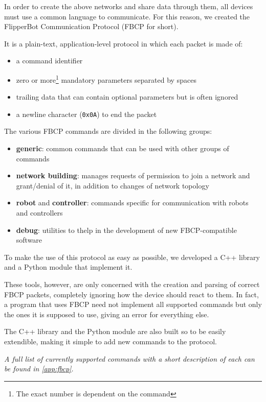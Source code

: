 In order to create the above networks and share data through them,
all devices must use a common language to communicate.
For this reason, we created the FlipperBot Communication Protocol
(FBCP for short).

It is a plain-text, application-level protocol in which each packet
is made of:
\begin{itemize}
  \item a command identifier
  \item zero or more\footnote{The exact number is dependent on the
    command} mandatory parameters separated by spaces
  \item trailing data that can contain optional parameters but is
    often ignored
  \item a newline character (\texttt{0x0A}) to end the packet
\end{itemize}

The various FBCP commands are divided in the following groups:
\begin{itemize}
  \item \textbf{generic}: common commands that can be used with
    other groups of commands
  \item \textbf{network building}: manages requests of permission to
    join a network and grant/denial of it, in addition to changes of
    network topology
  \item \textbf{robot} and \textbf{controller}: commands specific
    for communication with robots and controllers
  \item \textbf{debug}: utilities to thelp in the development of new
    FBCP-compatible software
\end{itemize}

To make the use of this protocol as easy as possible, we developed
a C++ library and a Python module that implement it.

These tools, however, are only concerned with the creation and
parsing of correct FBCP packets, completely ignoring how the device
should react to them. In fact, a program that uses FBCP need not
implement all supported commands but only the ones it is supposed to
use, giving an error for everything else.

The C++ library and the Python module are also built so to be easily
extendible, making it simple to add new commands to the protocol.

\textit{A full list of currently supported commands with a short
description of each can be found in \autoref{app:fbcp}.}

